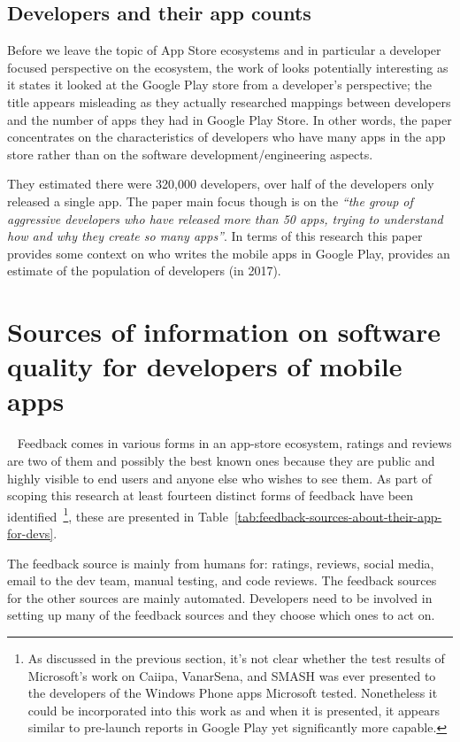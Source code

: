 \subsection{Developers and their app counts}
Before we leave the topic of App Store ecosystems and in particular a developer focused perspective on the ecosystem, the work of \citet{wang2017_exploratory_study_of_the_mobile_app_ecosystem} looks potentially interesting as it states it looked at the Google Play store from a developer's perspective; the title appears misleading as they actually researched mappings between developers and the number of apps they had in Google Play Store. In other words, the paper concentrates on the characteristics of developers who have many apps in the app store rather than on the software development/engineering aspects.

They estimated there were 320,000 developers, over half of the developers only released a single app. The paper main focus though is on the \emph{``the group of aggressive developers who have released more than 50 apps, trying to understand how and why they create so many apps''}. In terms of this research this paper provides some context on who writes the mobile apps in Google Play, provides an estimate of the population of developers (in 2017).


\section{Sources of information on software quality for developers of mobile apps}~\label{rw-sources-of-info-on-software-quality-for-devs-of-mobile-apps}
Feedback comes in various forms in an app-store ecosystem, ratings and reviews are two of them and possibly the best known ones because they are public and highly visible to end users and anyone else who wishes to see them. As part of scoping this research at least fourteen distinct forms of feedback have been identified~\footnote{As discussed in the previous section, it's not clear whether the test results of Microsoft's work on Caiipa, VanarSena, and SMASH was ever presented to the developers of the Windows Phone apps Microsoft tested. Nonetheless it could be incorporated into this work as and when it is presented, it appears similar to pre-launch reports in Google Play yet significantly more capable.}, these are presented in Table~\ref{tab:feedback-sources-about-their-app-for-devs}.

The feedback source is mainly from humans for: ratings, reviews, social media, email to the dev team, manual testing, and code reviews. The feedback sources for the other sources are mainly automated. Developers need to be involved in setting up many of the feedback sources and they choose which ones to act on.

